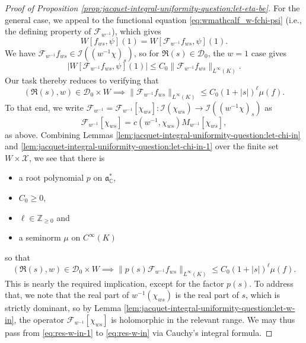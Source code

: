 \begin{proof}[Proof of Proposition \ref{prop:jacquet-integral-uniformity-question:let-eta-be}]
  For the general case, we appeal to the functional equation \eqref{eq:wmathcalf_w-fchi-psi} (i.e., the defining property of $\mathcal{F}_{w^{-1}}$), which gives
  \begin{equation*}
    W[f_{w s}, \psi](1)
    =
    W[\mathcal{F}_{w^{-1}} f_{w s}, \psi](1).
  \end{equation*}
  We have $\mathcal{F}_{w^{-1}} f_{w s} \in \mathcal{I}((w^{-1}\chi)_s)$, so for $\Re(s) \in \mathcal{D}_0$, the $w = 1$ case gives
  \begin{equation*}
    |W[\mathcal{F}_{w^{-1}} f_{w s}, \psi](1)| \leq C_0 \|\mathcal{F}_{w^{-1}} f_{w s}\|_{L^\infty(K)}.
  \end{equation*}
  Our task thereby reduces to verifying that
  \begin{equation}\label{eq:res-w-in}
    (\Re(s), w) \in \mathcal{D}_0 \times W \implies \|\mathcal{F}_{w^{-1}} f_{w s}\|_{L^\infty(K)} \leq C_0 (1 + |s|)^{\ell} \mu(f).
  \end{equation}
  To that end, we write $\mathcal{F}_{w^{-1}} = \mathcal{F}_{w^{-1}}[\chi_{w s}] : \mathcal{I}(\chi_{w s}) \rightarrow \mathcal{I}((w^{-1} \chi)_{s})$ as
  \begin{equation*}
    \mathcal{F}_{w^{-1}}[\chi_{w s}] = c(w^{-1},\chi_{w s}) M_{w^{-1}}[\chi_{w s}],
  \end{equation*}
  as above.  Combining Lemmas \ref{lem:jacquet-integral-uniformity-question:let-chi-in} and \ref{lem:jacquet-integral-uniformity-question:let-chi-in-1} over the finite set $W \times \mathcal{X}$, we see that there is
  \begin{itemize}
  \item a root polynomial $p$ on $\mathfrak{a}_{\mathbb{C}}^*$,
  \item $C_0 \geq 0$,
  \item $\ell \in \mathbb{Z}_{\geq 0}$ and
  \item a seminorm $\mu$ on $C^\infty(K)$
  \end{itemize}
  so that
  \begin{equation}\label{eq:res-w-in-1}
    (\Re(s), w) \in \mathcal{D}_0 \times W \implies \|p(s) \mathcal{F}_{w^{-1}} f_{w s}\|_{L^\infty(K)} \leq C_0 (1 + |s|)^{\ell} \mu(f).
  \end{equation}
  This is nearly the required implication, except for the factor $p(s)$.  To address that, we note that the real part of $w^{-1}(\chi_{w s})$ is the real part of $s$, which is strictly dominant, so by Lemma \ref{lem:jacquet-integral-uniformity-question:let-w-in}, the operator $\mathcal{F}_{w^{-1}}[\chi_{w s}]$ is holomorphic in the relevant range.  We may thus pass from \eqref{eq:res-w-in-1} to \eqref{eq:res-w-in} via Cauchy's integral formula.
\end{proof}

